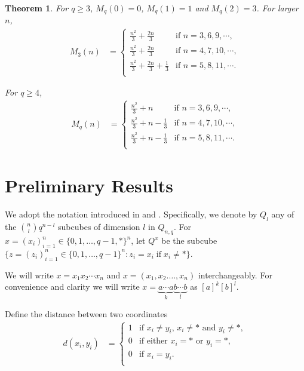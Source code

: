 \documentclass[reqno,11pt]{amsart}
\newtheorem{theorem}{Theorem}
\renewcommand{\geq}{\geqslant}
\begin{document}
\begin{theorem} \label{Theorem1}
For $q \geq 3$, $M_q(0)=0$, $M_q(1)=1$ and $M_q(2)=3$. For larger $n$, 
\begin{align*}
M_{3}(n)
&=
\begin{cases}
  \frac{n^2}{3}+\frac{2n}{3} & \text{if $n=3,6,9,\cdots,$}\\ 
  \frac{n^2}{3}+\frac{2n}{3}& \text{if $n=4,7,10, \cdots,$} \\
   \frac{n^2}{3}+\frac{2n}{3}+\frac{1}{3}& \text{if $n=5,8,11,\cdots.$}\\ 
\end{cases}
\end{align*}

For $q \geq 4$,
\begin{align*}
M_{q}(n)
&=
\begin{cases}
  \frac{n^2}{3}+n & \text{if $n=3,6,9,\cdots,$}\\
  \frac{n^2}{3}+n-\frac{1}{3}& \text{if $n=4,7,10, \cdots,$} \\
   \frac{n^2}{3}+n-\frac{1}{3}& \text{if $n=5,8,11,\cdots.$}\\
\end{cases}
\end{align*}


\end{theorem}




\section{Preliminary Results}
We adopt the notation introduced in \cite{balogh_bollobas_2006} and \cite{Michal}. Specifically, we denote by $Q_l$ any of the $\binom{n}{l}q^{n-l}$ subcubes of dimension $l$ in $Q_{n,q}$. For $x=(x_i)_{i=1}^n \in \{0,1,\dots,q-1,*\}^n$, let $Q^{x}$ be the subcube $\{z=(z_i)_{i=1}^n \in \{0,1,\dots,q-1\}^n : z_i=x_i \; \text{if} \; x_i \neq *\}$. 

We will write $x=x_1x_2\cdots x_n$ and $x=(x_1,x_2.\dots,x_n)$ interchangeably. For convenience and clarity we will write $x=\underbrace{a\cdots a}_{k}\underbrace{b\cdots b}_{l}$ as $[a]^k[b]^l$.

Define the distance between two coordinates
\begin{align*}
d(x_i,y_i)
&=
\begin{cases}
  1& \text{if $x_i \neq y_i$, $x_i \neq *$ and $y_i \neq *$}, \\
   0 & \text{if either $x_i=*$ or $y_i=*$},\\
  0 & \text{if $x_i=y_i$}.\\ 
\end{cases}
\end{align*}
\end{document}
